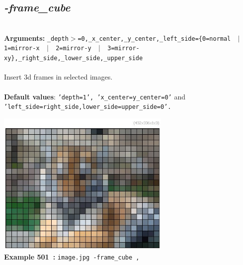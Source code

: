 \documentclass[a4paper,11pt,twoside]{book}
\begin{document}
\subsection{\emph{-frame\_cube} }\vspace*{-0.5em}
~\\\textbf{Arguments: } 
{\small \texttt{\_depth$>$=0,\_x\_center,\_y\_center,\_left\_side=\{0=normal ~$|$~ 1=mirror-x ~$|$~ 2=mirror-y ~$|$~ 3=mirror-xy\},\_right\_side,\_lower\_side,\_upper\_side}}\\~\\
Insert 3d frames in selected images.
~\\~\\\textbf{Default values}: {\small \texttt{'depth=1', 'x\_center=y\_center=0'} and \texttt{'left\_side=right\_side,lower\_side=upper\_side=0'.}}
\begin{center}\includegraphics[keepaspectratio=true,height=7cm,width=\textwidth]{img/gmic_def501.jpg}\\
{\footnotesize \textbf{Example 501~:} \texttt{image.jpg -frame\_cube ,}}
\end{center}
\end{document}
